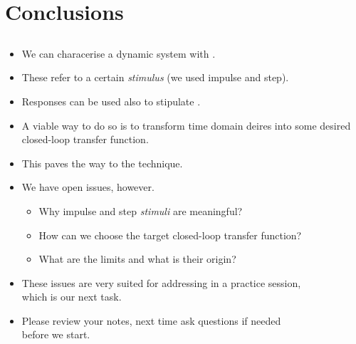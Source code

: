 \section{Conclusions}
\subsection{}

\begin{frame}
\myPause
 \begin{itemize}[<+-| alert@+>]
 \item We can characerise a dynamic system with .
 \item These refer to a certain \emph{stimulus} (we used impulse and step).
 \item Responses can be used also to stipulate .
 \item A viable way to do so is to transform time domain deires into some desired
       closed-loop transfer function.
 \item This paves the way to the  technique.
 \end{itemize}
\end{frame}

\begin{frame}
\myPause
 \begin{itemize}[<+-| alert@+>]
 \item We have open issues, however.
       \begin{itemize}[<+-| alert@+>]
       \item Why impulse and step \emph{stimuli} are meaningful?
       \item How can we choose the target closed-loop transfer function?
       \item What are the limits and what is their origin?
       \end{itemize}
 \item \vfill These issues are very suited for addressing in a practice session,\\
       which is our next task.
 \item Please review your notes, next time ask questions if needed\\
       before we start.
 \end{itemize}
\end{frame}

